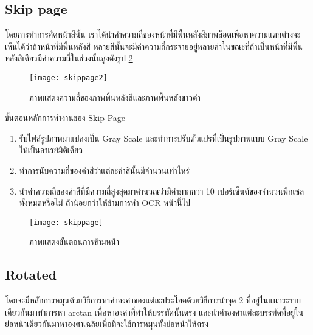 \subsection{Skip page}

โดยการทำการคัดหน้าสีนั้น เราได้นำค่าความถี่ของหน้าที่มีพื้นหลังสีมาพล็อตเพื่อหาความแตกต่างจะเห็นได้ว่าถ้าหน้าที่มีพื้นหลังสี หลายสีนั้นจะมีค่าความถี่กระจายอยู่หลายค่าในขณะที่ถ้าเป็นหน้าที่มีพื้นหลังสีเดียวมีค่าความถี่ในช่วงนั้นสูงดังรูป \ref{fig:skippage}

\begin{figure}[H]
    \centering
    \texttt{[image: skippage2]}
    \caption{ภาพแสดงความถี่ของภาพพื้นหลังสีและภาพพื้นหลังขาวดำ}\label{fig:skippage2}
\end{figure}

ขั้นตอนหลักการทำงานของ Skip Page

\begin{enumerate}
    \item รับไฟล์รูปภาพมาแปลงเป็น Gray Scale และทำการปรับตัวแปรที่เป็นรูปภาพแบบ Gray Scale ให้เป็นอาเรย์มิติเดียว
    \item ทำการนับความถี่ของค่าสีว่าแต่ละค่าสีนั้นมีจำนวนเท่าไหร่
    \item นำค่าความถี่ของค่าสีที่มีความถี่สูงสุดมาคำนวณว่ามีค่ามากกว่า 10 เปอร์เซ็นต์ของจำนวนพิกเซลทั้งหมดหรือไม่ ถ้าน้อยกว่าให้ข้ามการทำ OCR หน้านี้ไป
\end{enumerate}

\begin{figure}[H]
    \centering
    \texttt{[image: skippage]}
    \caption{ภาพแสดงขั้นตอนการข้ามหน้า}\label{fig:skippage}
\end{figure}

\subsection{Rotated}

โดยจะมีหลักการหมุนด้วยวิธีการหาค่าองศาของแต่ละประโยคด้วยวิธีการนำจุด 2 ที่อยู่ในแนวระราบเดียวกันมาทำการหา arctan เพื่อหาองศาที่ทำให้บรรทัดนั้นตรง และนำค่าองศาแต่ละบรรทัดที่อยู่ในย่อหน้าเดียวกันมาหาองศาเฉลี่ยเพื่อที่จะใช้การหมุนทั้งย่อหน้าให้ตรง

